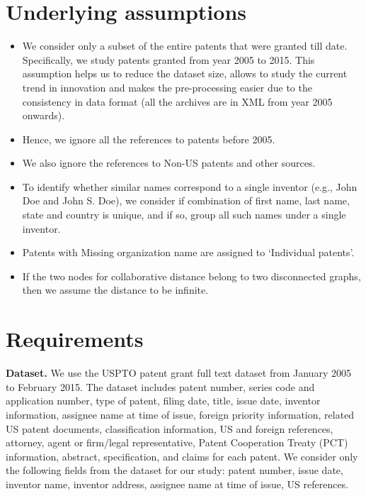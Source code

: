 \documentclass[11pt]{article}
\renewcommand{\paragraph}{\vspace{3pt}\noindent\textbf}
\newcommand{\squish}{
  \setlength{\topsep}{0pt}
  \setlength{\itemsep}{0ex}
  \setlength{\parskip}{0pt}
}
\begin{document}
		
\section{Underlying assumptions} %
\begin{itemize}
\item We consider only a subset of the entire patents that were granted till date. Specifically, we study patents granted from year 2005 to 2015. This assumption helps us to reduce the dataset size, allows to study the current trend in innovation and makes the pre-processing easier due to the consistency in data format (all the archives are in XML from year 2005 onwards).
\item Hence, we ignore all the references to patents before 2005. 
\item We also ignore the references to Non-US patents and other sources.
\item To identify whether similar names correspond to a single inventor (e.g., John Doe and John S. Doe), we consider if combination of first name, last name, state and country is unique, and if so, group all such names under a single inventor.
\item Patents with Missing organization name  are assigned to ‘Individual patents’.
\item If the two nodes for collaborative distance belong to two disconnected graphs, then we assume the distance to be infinite.
\end{itemize}


\section{Requirements}

\paragraph {Dataset.} 
We use the USPTO patent grant full text dataset from January 2005 to February 2015. 
The dataset includes patent number, series code and application number, type of patent, filing date, title, issue date, inventor information, assignee name at time of issue, foreign priority information, related US patent documents, classification information, US and foreign references, attorney, agent or firm/legal representative, Patent Cooperation Treaty (PCT) information, abstract, specification, and claims for each patent. We consider only the following fields from the dataset for our study: patent number, issue date, inventor name, inventor address, assignee name at time of issue, US references.
\end{document}
